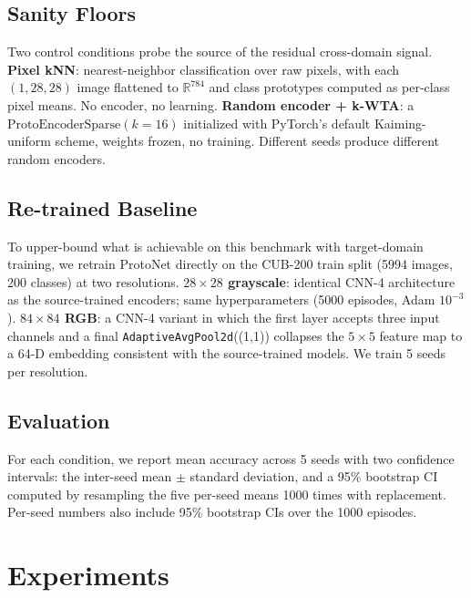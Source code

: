 \documentclass[11pt]{article}
\begin{document}
\subsection{Sanity Floors}
\label{subsec:floors}

Two control conditions probe the source of the residual cross-domain signal. \textbf{Pixel kNN}: nearest-neighbor classification over raw pixels, with each $(1, 28, 28)$ image flattened to $\mathbb{R}^{784}$ and class prototypes computed as per-class pixel means. No encoder, no learning. \textbf{Random encoder + k-WTA}: a $\text{ProtoEncoderSparse}(k=16)$ initialized with PyTorch's default Kaiming-uniform scheme, weights frozen, no training. Different seeds produce different random encoders.

\subsection{Re-trained Baseline}
\label{subsec:retrained}

To upper-bound what is achievable on this benchmark with target-domain training, we retrain ProtoNet directly on the CUB-200 train split (5994 images, 200 classes) at two resolutions. \textbf{$28 \times 28$ grayscale}: identical CNN-4 architecture as the source-trained encoders; same hyperparameters (5000 episodes, Adam $10^{-3}$). \textbf{$84 \times 84$ RGB}: a CNN-4 variant in which the first layer accepts three input channels and a final \texttt{AdaptiveAvgPool2d}((1,1)) collapses the $5 \times 5$ feature map to a 64-D embedding consistent with the source-trained models. We train 5 seeds per resolution.

\subsection{Evaluation}
\label{subsec:eval}

For each condition, we report mean accuracy across 5 seeds with two confidence intervals: the inter-seed mean $\pm$ standard deviation, and a 95\% bootstrap CI computed by resampling the five per-seed means 1000 times with replacement. Per-seed numbers also include 95\% bootstrap CIs over the 1000 episodes.

\section{Experiments}
\label{sec:experiments}
\end{document}
